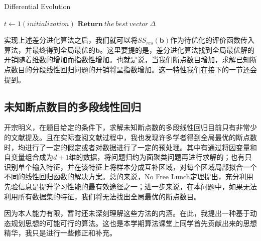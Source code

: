 \begin{algorithm2e}
    \caption{Differential Evolution}\label{algorithm}
    $t\leftarrow 1(initialization)$\;
    {}
    $\mathbf{Return}~the~best~vector~\Delta$
\end{algorithm2e}

实现上述差分进化算法之后，我们就可以将$SS_{res}(\mathbf{b})$作为待优化的评价函数传入算法，并最终得到全局最优的$\mathbf{b}$。这里要提的是，差分进化算法找到全局最优解的开销随着维数的增加而指数性增加。也就是说，当我们断点数目增加，求解已知断点数目的分段线性回归问题的开销将呈指数增加。这一特性我们在接下的一节还会提到。


\subsection{未知断点数目的多段线性回归\label{p3}}

开宗明义，在题目给定的条件下，求解未知断点数的多段线性回归目前只有非常少的文献提及。且在实际查阅文献过程中，我也发现许多学者得到全局最优的断点数时，均进行了一定的假定或者对数据进行了一定的预处理。其中有通过将因变量和自变量组合成为$d+1$维的数据，将问题归约为面聚类问题再进行求解的\cite{ref5}；也有只识别单个输入特征，并在该特征上将样本分成互补区域，对每个区域局部拟合一个不同的线性回归函数的解决方案\cite{ref4}。总的来说，No Free Lunch定理提出，充分利用先验信息是提升学习性能的最有效途径之一；进一步来说，在本问题中，如果无法利用所有数据集的特征，我们将无法找出全局最优的断点数目。

因为本人能力有限，暂时还未深刻理解这些方法的内涵。在此，我提出一种基于动态规划思想的可能可行的算法。这也是本学期算法课堂上同学首先贡献出来的思想精华，我只是进行一些修正和补充。

